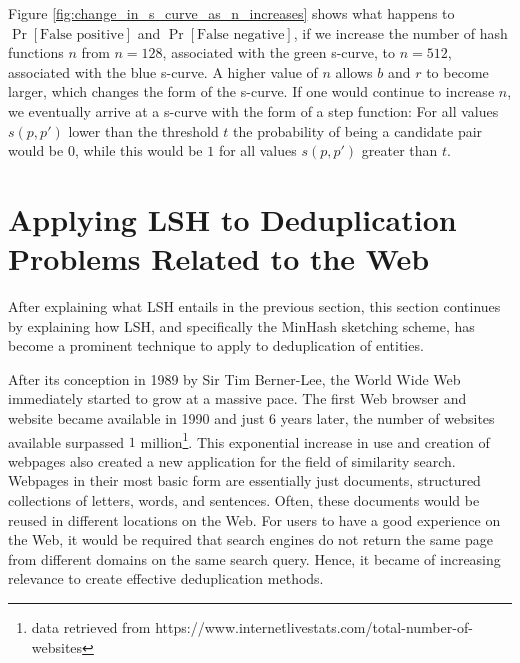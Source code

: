 Figure \ref{fig:change_in_s_curve_as_n_increases} shows what happens to $\operatorname{Pr}[\text{False positive}]$ and $\operatorname{Pr}[\text{False negative}]$, if we increase the number of hash functions $n$ from $n=128$, associated with the green s-curve, to $n=512$, associated with the blue s-curve. A higher value of $n$ allows $b$ and $r$ to become larger, which changes the form of the s-curve. If one would continue to increase $n$, we eventually arrive at a s-curve with the form of a step function: For all values $s(p, p')$ lower than the threshold $t$ the probability of being a candidate pair would be $0$, while this would be $1$ for all values $s(p, p')$  greater than $t$.  


\section{Applying LSH to Deduplication Problems Related to the Web}
\label{section:lit:applying_lsh_to_deduplication_of_docs_on_web}
After explaining what LSH entails in the previous section, this section continues by explaining how LSH, and specifically the MinHash sketching scheme, has become a prominent technique to apply to deduplication of entities. 

After its conception in 1989 by Sir Tim Berner-Lee, the World Wide Web immediately started to grow at a massive pace. The first Web browser and website became available in 1990 and just $6$ years later, the number of websites available surpassed $1$ million\footnote{data retrieved from https://www.internetlivestats.com/total-number-of-websites}. This exponential increase in use and creation of webpages also created a new application for the field of similarity search. Webpages in their most basic form are essentially just documents, structured collections of letters, words, and sentences. Often, these documents would be reused in different locations on the Web. For users to have a good experience on the Web, it would be required that search engines do not return the same page from different domains on the same search query. Hence, it became of increasing relevance to create effective deduplication methods. 

